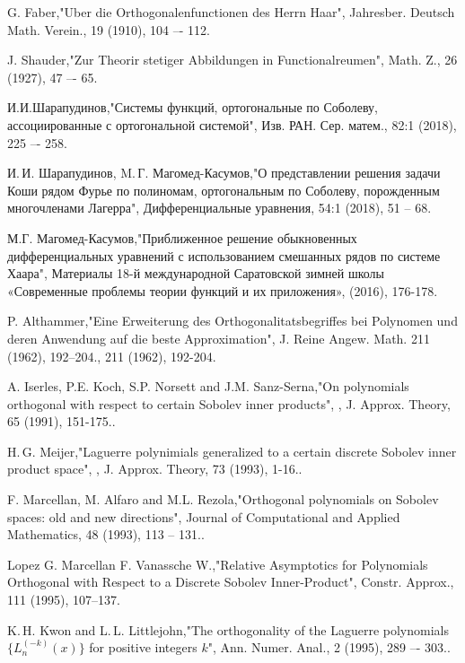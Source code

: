 \begin{thebibliography}{20}
	
G. Faber,"Uber die Orthogonalenfunctionen des Herrn Haar", Jahresber. Deutsch Math. Verein., 19 (1910), 104 –- 112.


J. Shauder,"Zur Theorir stetiger Abbildungen in Functionalreumen", Math. Z., 26 (1927), 47 –- 65.


И.И.Шарапудинов,"Системы функций, ортогональные по Соболеву, ассоциированные с ортогональной системой", Изв. РАН. Сер. матем., 82:1 (2018), 225 –- 258.


И.\,И. Шарапудинов, M.\,Г. Магомед-Касумов,"О представлении решения задачи Коши  рядом Фурье  по полиномам, ортогональным по  Соболеву, порожденным многочленами Лагерра", Дифференциальные уравнения, 54:1 (2018), 51 -- 68.


М.Г. Магомед-Касумов,"Приближенное решение обыкновенных дифференциальных уравнений с использованием смешанных рядов по системе Хаара", Материалы 18-й международной Саратовской зимней школы «Современные проблемы теории функций и их приложения»,  (2016), 176-178.


P. Althammer,"Eine Erweiterung des Orthogonalitatsbegriffes bei Polynomen und deren Anwendung  auf die beste Approximation", J. Reine Angew. Math. 211 (1962), 192–204., 211 (1962), 192-204.


A. Iserles, P.E. Koch, S.P. Norsett and J.M. Sanz-Serna,"On polynomials  orthogonal  with respect  to certain Sobolev inner products", ,  J. Approx. Theory, 65 (1991), 151-175..


H.\,G. Meijer,"Laguerre polynimials generalized to a certain discrete Sobolev inner product space", ,  J. Approx. Theory, 73 (1993), 1-16..


F. Marcellan, M. Alfaro and M.L. Rezola,"Orthogonal polynomials on Sobolev spaces: old and new directions", Journal of Computational and Applied Mathematics, 48 (1993), 113 -- 131..


Lopez G. Marcellan F. Vanassche W.,"Relative Asymptotics for Polynomials Orthogonal with Respect to a Discrete Sobolev Inner-Product", Constr. Approx., 111 (1995), 107–137.


K.\,H. Kwon and L.\,L. Littlejohn,"The orthogonality of the Laguerre polynomials $\{L_n^{(-k)}(x)\}$ for positive integers $k$", Ann. Numer. Anal., 2 (1995), 289 –- 303..



\end{thebibliography}
